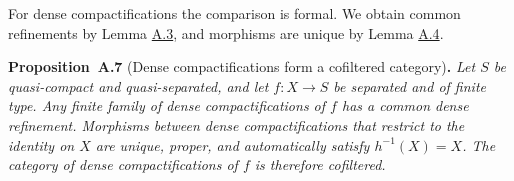 \documentclass[11pt]{article}
\newenvironment{bpstatement}[2]{\par\addvspace{0.6\baselineskip}\noindent\textbf{#1}#2\textbf{.}\enspace\ignorespaces}
  {\par\addvspace{0.4\baselineskip}}
\newenvironment{bpstatementit}[2]{\begin{bpstatement}{#1}{#2}\itshape\ignorespaces}{\end{bpstatement}}
\begin{document}
\label{bp20}%
For dense compactifications the comparison is formal. We obtain common refinements by Lemma \hyperref[bp11]{A.3}, and morphisms are unique by Lemma \hyperref[bp14]{A.4}.

\label{bp21}%
\begin{bpstatementit}{Proposition~A.7}{ (Dense compactifications form a cofiltered category)}
Let \(S\) be quasi-compact and quasi-separated, and let \(f:X\to S\) be separated and of finite type. Any finite family of dense compactifications of \(f\) has a common dense refinement. Morphisms between dense compactifications that restrict to the identity on \(X\) are unique, proper, and automatically satisfy \(h^{-1}(X)=X\). The category of dense compactifications of \(f\) is therefore cofiltered.
\end{bpstatementit}
\end{document}
